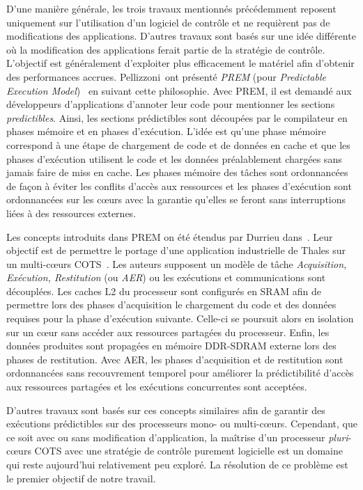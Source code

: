 \documentclass[main.tex]{subfiles}
\begin{document}
D'une manière générale, les trois travaux mentionnés précédemment reposent uniquement sur l'utilisation d'un logiciel de contrôle et ne requièrent pas de modifications des applications. D'autres travaux sont basés sur une idée différente où la modification des applications ferait partie de la stratégie de contrôle. L'objectif est généralement d'exploiter plus efficacement le matériel afin d'obtenir des performances accrues. Pellizzoni~\etal ont présenté \emph{PREM} (pour \emph{Predictable Execution Model})~\cite{Pellizzoni2011_PREM} en suivant cette philosophie. Avec PREM, il est demandé aux développeurs d'applications d'annoter leur code pour mentionner les sections \emph{predictibles}. Ainsi, les sections prédictibles sont découpées par le compilateur en phases mémoire et en phases d'exécution. L'idée est qu'une phase mémoire correspond à une étape de chargement de code et de données en cache et que les phases d'exécution utilisent le code et les données préalablement chargées sans jamais faire de miss en cache. Les phases mémoire des tâches sont ordonnancées de façon à éviter les conflits d'accès aux ressources et les phases d'exécution sont ordonnancées sur les c\oe{}urs avec la garantie qu'elles se feront sans interruptions liées à des ressources externes. 

Les concepts introduits dans PREM on été étendus par Durrieu \etal dans~\cite{Durrieu2014}. Leur objectif est de permettre le portage d'une application industrielle de Thales sur un multi-c\oe{}urs COTS~\cite{TMS320C6678}. Les auteurs supposent un modèle de tâche \emph{Acquisition, Exécution, Restitution} (ou \emph{AER}) ou les exécutions et communications sont découplées. Les caches L2 du processeur sont configurés en SRAM afin de permettre lors des phases d'acquisition le chargement du code et des données requises pour la phase d'exécution suivante. Celle-ci se poursuit alors en isolation sur un c\oe{}ur sans accéder aux ressources partagées du processeur. Enfin, les données produites sont propagées en mémoire DDR-SDRAM externe lors des phases de restitution. Avec AER, les phases d'acquisition et de restitution sont ordonnancées sans recouvrement temporel pour améliorer la prédictibilité d'accès aux ressources partagées et les exécutions concurrentes sont acceptées. 

D'autres travaux\cite{Jegu2012,Tabish2016} sont basés sur ces concepts similaires afin de garantir des exécutions prédictibles sur des processeurs mono- ou multi-c\oe{}urs. Cependant, que ce soit avec ou sans modification d'application, la maîtrise d'un processeur \emph{pluri}-c\oe{}urs COTS avec une stratégie de contrôle purement logicielle est un domaine qui reste aujourd'hui relativement peu exploré. La résolution de ce problème est le premier objectif de notre travail.
\end{document}
